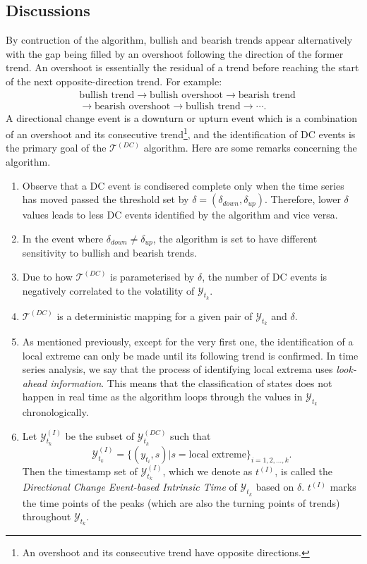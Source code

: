 \subsection{Discussions}\label{subsec: dc discussion}
By contruction of the algorithm, bullish and bearish trends appear alternatively with the gap being filled by an overshoot following the direction of the former trend. An overshoot is essentially the residual of a trend before reaching the start of the next opposite-direction trend. For example:
\begin{align*}
    &\text{bullish trend} \rightarrow \text{bullish overshoot} \rightarrow \text{bearish trend} \\
    &\rightarrow \text{bearish overshoot} \rightarrow \text{bullish trend} \rightarrow \cdots.
\end{align*}
A directional change event is a downturn or upturn event which is a combination of an overshoot and its consecutive trend\footnote{An overshoot and its consecutive trend have opposite directions.}, and the identification of DC events is the primary goal of the $\mathcal{T}^{(DC)}$ algorithm. Here are some remarks concerning the algorithm.
\begin{enumerate}
    \item Observe that a DC event is condisered complete only when the time series has moved passed the threshold set by $\delta = (\delta_{down}, \delta_{up})$. Therefore, lower $\delta$ values leads to less DC events identified by the algorithm and vice versa.
    \item In the event where $\delta_{down} \neq \delta_{up}$, the algorithm is set to have different sensitivity to bullish and bearish trends.
    \item Due to how $\mathcal{T}^{(DC)}$ is parameterised by $\delta$, the number of DC events is negatively correlated to the volatility of $\mathcal{Y}_{t_k}$.
    \item $\mathcal{T}^{(DC)}$ is a deterministic mapping for a given pair of $\mathcal{Y}_{t_k}$ and $\delta$.
    \item As mentioned previously, except for the very first one, the identification of a local extreme can only be made until its following trend is confirmed. In time series analysis, we say that the process of identifying local extrema uses \textit{look-ahead information}. This means that the classification of states does not happen in real time as the algorithm loops through the values in $\mathcal{Y}_{t_k}$ chronologically.
    \item Let $\mathcal{Y}^{(I)}_{t_k}$ be the subset of $\mathcal{Y}^{(DC)}_{t_k}$ such that
    \begin{equation*}
        \mathcal{Y}^{(I)}_{t_k} = \{ (y_{t_i}, s) | s = \text{local extreme} \}_{i = 1, 2, \ldots, k}.
    \end{equation*}
    Then the timestamp set of $\mathcal{Y}^{(I)}_{t_k}$, which we denote as $t^{(I)}$, is called the \textit{Directional Change Event-based Intrinsic Time} of $\mathcal{Y}_{t_k}$ based on $\delta$. $t^{(I)}$ marks the time points of the peaks (which are also the turning points of trends) throughout $\mathcal{Y}_{t_k}$.
\end{enumerate}
